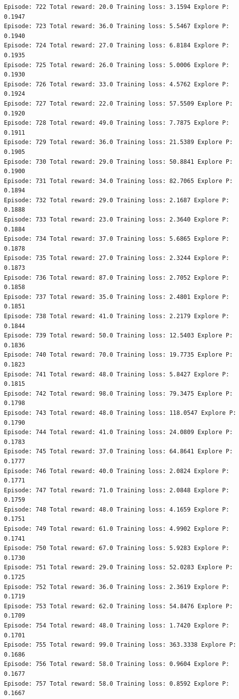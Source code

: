 \documentclass[11pt]{article}
\begin{document}
\begin{Verbatim}[commandchars=\\\{\}]
Episode: 722 Total reward: 20.0 Training loss: 3.1594 Explore P: 0.1947
Episode: 723 Total reward: 36.0 Training loss: 5.5467 Explore P: 0.1940
Episode: 724 Total reward: 27.0 Training loss: 6.8184 Explore P: 0.1935
Episode: 725 Total reward: 26.0 Training loss: 5.0006 Explore P: 0.1930
Episode: 726 Total reward: 33.0 Training loss: 4.5762 Explore P: 0.1924
Episode: 727 Total reward: 22.0 Training loss: 57.5509 Explore P: 0.1920
Episode: 728 Total reward: 49.0 Training loss: 7.7875 Explore P: 0.1911
Episode: 729 Total reward: 36.0 Training loss: 21.5389 Explore P: 0.1905
Episode: 730 Total reward: 29.0 Training loss: 50.8841 Explore P: 0.1900
Episode: 731 Total reward: 34.0 Training loss: 82.7065 Explore P: 0.1894
Episode: 732 Total reward: 29.0 Training loss: 2.1687 Explore P: 0.1888
Episode: 733 Total reward: 23.0 Training loss: 2.3640 Explore P: 0.1884
Episode: 734 Total reward: 37.0 Training loss: 5.6865 Explore P: 0.1878
Episode: 735 Total reward: 27.0 Training loss: 2.3244 Explore P: 0.1873
Episode: 736 Total reward: 87.0 Training loss: 2.7052 Explore P: 0.1858
Episode: 737 Total reward: 35.0 Training loss: 2.4801 Explore P: 0.1851
Episode: 738 Total reward: 41.0 Training loss: 2.2179 Explore P: 0.1844
Episode: 739 Total reward: 50.0 Training loss: 12.5403 Explore P: 0.1836
Episode: 740 Total reward: 70.0 Training loss: 19.7735 Explore P: 0.1823
Episode: 741 Total reward: 48.0 Training loss: 5.8427 Explore P: 0.1815
Episode: 742 Total reward: 98.0 Training loss: 79.3475 Explore P: 0.1798
Episode: 743 Total reward: 48.0 Training loss: 118.0547 Explore P: 0.1790
Episode: 744 Total reward: 41.0 Training loss: 24.0809 Explore P: 0.1783
Episode: 745 Total reward: 37.0 Training loss: 64.8641 Explore P: 0.1777
Episode: 746 Total reward: 40.0 Training loss: 2.0824 Explore P: 0.1771
Episode: 747 Total reward: 71.0 Training loss: 2.0848 Explore P: 0.1759
Episode: 748 Total reward: 48.0 Training loss: 4.1659 Explore P: 0.1751
Episode: 749 Total reward: 61.0 Training loss: 4.9902 Explore P: 0.1741
Episode: 750 Total reward: 67.0 Training loss: 5.9283 Explore P: 0.1730
Episode: 751 Total reward: 29.0 Training loss: 52.0283 Explore P: 0.1725
Episode: 752 Total reward: 36.0 Training loss: 2.3619 Explore P: 0.1719
Episode: 753 Total reward: 62.0 Training loss: 54.8476 Explore P: 0.1709
Episode: 754 Total reward: 48.0 Training loss: 1.7420 Explore P: 0.1701
Episode: 755 Total reward: 99.0 Training loss: 363.3338 Explore P: 0.1686
Episode: 756 Total reward: 58.0 Training loss: 0.9604 Explore P: 0.1677
Episode: 757 Total reward: 58.0 Training loss: 0.8592 Explore P: 0.1667

\end{Verbatim}
\end{document}
